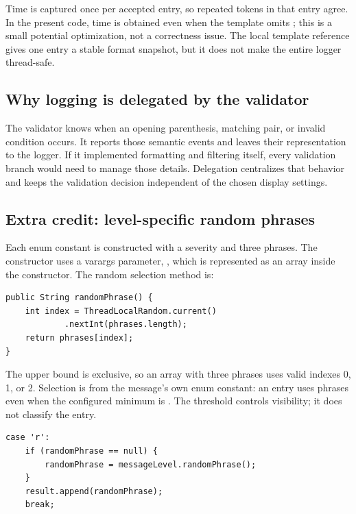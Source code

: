 Time is captured once per accepted entry, so repeated  tokens in that entry agree. In the present code, time is obtained even when the template omits ; this is a small potential optimization, not a correctness issue. The local template reference gives one entry a stable format snapshot, but it does not make the entire logger thread-safe.

\subsection{Why logging is delegated by the validator}
The validator knows when an opening parenthesis, matching pair, or invalid condition occurs. It reports those semantic events and leaves their representation to the logger. If it implemented formatting and filtering itself, every validation branch would need to manage those details. Delegation centralizes that behavior and keeps the validation decision independent of the chosen display settings.

\subsection{Extra credit: level-specific random phrases}
Each enum constant is constructed with a severity and three phrases. The constructor uses a varargs parameter, , which is represented as an array inside the constructor. The random selection method is:

\begin{samepage}
\begin{lstlisting}
public String randomPhrase() {
    int index = ThreadLocalRandom.current()
            .nextInt(phrases.length);
    return phrases[index];
}
\end{lstlisting}
\end{samepage}

The upper bound is exclusive, so an array with three phrases uses valid indexes 0, 1, or 2. Selection is from the message's own enum constant: an  entry uses  phrases even when the configured minimum is . The threshold controls visibility; it does not classify the entry.

\begin{samepage}
\begin{lstlisting}
case 'r':
    if (randomPhrase == null) {
        randomPhrase = messageLevel.randomPhrase();
    }
    result.append(randomPhrase);
    break;
\end{lstlisting}
\end{samepage}

